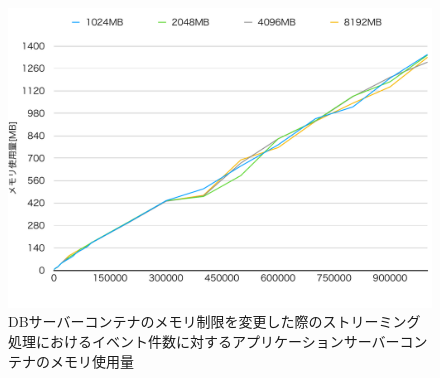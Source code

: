 \documentclass[../../../../../main]{subfiles}
\begin{document}
    \begin{figure}[H]
        \centering
        \includegraphics[width=12cm]{graph}
        \caption{DBサーバーコンテナのメモリ制限を変更した際のストリーミング処理におけるイベント件数に対するアプリケーションサーバーコンテナのメモリ使用量}
        \label{fig:stream-change-db-memory-limit-app-memory-app_4_8192-db_400}
    \end{figure}
\end{document}

